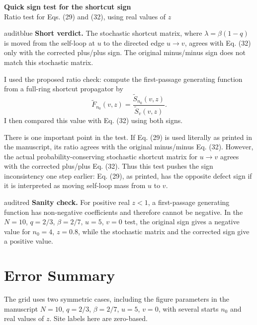 \documentclass[11pt]{article}
\begin{document}
\begin{center}
{\Large\bfseries Quick sign test for the shortcut sign}\\[0.3em]
{\small Ratio test for Eqs. (29) and (32), using real values of \(z\)}
\end{center}

\begin{resultbox}{auditblue}
\textbf{Short verdict.}
The stochastic shortcut matrix, where \(\lambda=\beta(1-q)\) is moved from the
self-loop at \(u\) to the directed edge \(u\to v\), agrees with Eq. (32) only
with the corrected plus/plus sign.  The original minus/minus sign does not
match this stochastic matrix.
\end{resultbox}

I used the proposed ratio check: compute the first-passage generating
function from a full-ring shortcut propagator by
\[
\widetilde F_{n_0}(v,z)=\frac{\widetilde S_{n_0}(v,z)}
{\widetilde S_v(v,z)}.
\]
I then compared this value with Eq. (32) using both signs.

There is one important point in the test.  If Eq. (29) is used literally as
printed in the manuscript, its ratio agrees with the original minus/minus
Eq. (32).  However, the actual probability-conserving stochastic shortcut
matrix for \(u\to v\) agrees with the corrected plus/plus Eq. (32).  Thus this
test pushes the sign inconsistency one step earlier: Eq. (29), as printed, has
the opposite defect sign if it is interpreted as moving self-loop mass from
\(u\) to \(v\).

\begin{resultbox}{auditred}
\textbf{Sanity check.}
For positive real \(z<1\), a first-passage generating function has non-negative
coefficients and therefore cannot be negative.  In the \(N=10\), \(q=2/3\),
\(\beta=2/7\), \(u=5\), \(v=0\) test, the original sign gives a negative value
for \(n_0=4\), \(z=0.8\), while the stochastic matrix and the corrected sign
give a positive value.
\end{resultbox}

\section*{Error Summary}

The grid uses two symmetric cases, including the figure parameters in the manuscript
\(N=10\), \(q=2/3\), \(\beta=2/7\), \(u=5\), \(v=0\), with several starts
\(n_0\) and real values of \(z\).  Site labels here are zero-based.
\end{document}
